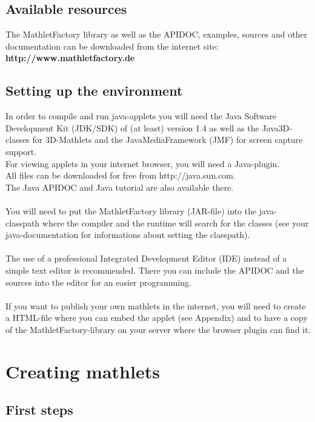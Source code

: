 \documentclass[a4paper,12pt]{book}
\begin{document}
\section{Available resources}
  The MathletFactory library as well as the APIDOC, examples, sources and other
  documentation can be downloaded from the internet site:\\
  \indent\indent\indent\indent\indent\indent \textbf{http://www.mathletfactory.de}

\section{Setting up the environment}
  In order to compile and run java-applets you will need the Java Software Development Kit 
  (JDK/SDK) of (at least) version 1.4 as well as the Java3D-classes for 3D-Mathlets
  and the JavaMediaFramework (JMF) for screen capture support.\\
  For viewing applets in your internet browser, you will need a Java-plugin.\\
  All files can be downloaded for free from http://java.sun.com.\\
  The Java APIDOC and Java tutorial are also available there.
  \\\\
  You will need to put the MathletFactory library (JAR-file) into the java-classpath
  where the compiler and the runtime will search for the classes (see your 
  java-documentation for informations about setting the classpath).
  \\\\
  The use of a professional Integrated Development Editor (IDE) instead of a simple
  text editor is recommended. There you can include the APIDOC and the sources
  into the editor for an easier programming. 
  \\\\
  If you want to publish your own mathlets in the internet, you will need to 
  create a HTML-file where you can embed the applet (see Appendix) and to have 
  a copy of the MathletFactory-library on your server where the browser plugin 
  can find it.

\newpage

\chapter{Creating mathlets}

\section{First steps}
\end{document}
